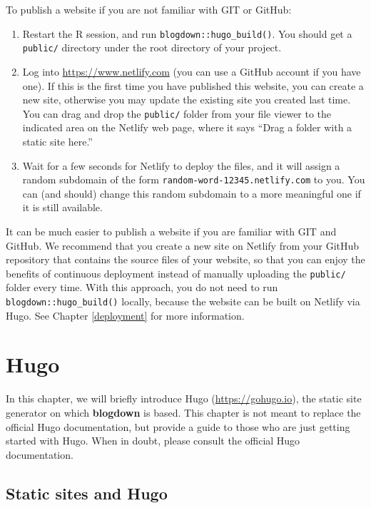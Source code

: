 \documentclass[12pt,]{krantz}
\theoremstyle{definition}
\theoremstyle{definition}
\theoremstyle{definition}
\theoremstyle{remark}
\begin{document}
To publish a website if you are not familiar with GIT or GitHub:

\begin{enumerate}
\def\labelenumi{\arabic{enumi}.}
\item
  Restart the R session, and run \texttt{blogdown::hugo\_build()}. You
  should get a \texttt{public/} directory under the root directory of
  your project.
\item
  Log into \url{https://www.netlify.com} (you can use a
  GitHub account if you have one). If this is the first time you have
  published this website, you can create a new site, otherwise you may
  update the existing site you created last time. You can drag and drop
  the \texttt{public/} folder from your file viewer to the indicated
  area on the Netlify web page, where it says ``Drag a folder with a
  static site here.''
\item
  Wait for a few seconds for Netlify to deploy the files, and it will
  assign a random subdomain of the form
  \texttt{random-word-12345.netlify.com} to you. You can (and should)
  change this random subdomain to a more meaningful one if it is still
  available.
\end{enumerate}

It can be much easier to publish a website if you are familiar with GIT
and GitHub. We recommend that you create a new site on Netlify from your
GitHub repository that contains the source files of your website, so
that you can enjoy the benefits of continuous deployment instead of
manually uploading the \texttt{public/} folder every time. With this
approach, you do not need to run \texttt{blogdown::hugo\_build()}
locally, because the website can be built on Netlify via Hugo. See
Chapter \ref{deployment} for more information.

\hypertarget{hugo}{%
\chapter{Hugo}\label{hugo}}

In this chapter, we will briefly introduce Hugo
(\url{https://gohugo.io}), the static site generator on which
\textbf{blogdown} is based. This chapter is not meant to replace the
official Hugo documentation, but provide a guide to those who are just
getting started with Hugo. When in doubt, please consult the official
Hugo documentation.

\hypertarget{static-sites}{%
\section{Static sites and Hugo}\label{static-sites}}
\end{document}
